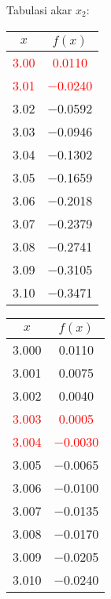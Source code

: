 \documentclass{article}
\begin{document}
\begin{enumerate}
\begin{enumerate}
            Tabulasi akar $x_2$: \\
            \begin{tabular}{|c|c|}
                \hline
                $x$   & $f(x)$ \\
                \hline
                \textcolor{red}{\num{3,00}} & \textcolor{red}{\num{0,0110}} \\
                \textcolor{red}{\num{3,01}} & \textcolor{red}{\num{-0,0240}} \\
                \num{3,02} & \num{-0,0592} \\
                \num{3,03} & \num{-0,0946} \\
                \num{3,04} & \num{-0,1302} \\
                \num{3,05} & \num{-0,1659} \\
                \num{3,06} & \num{-0,2018} \\
                \num{3,07} & \num{-0,2379} \\
                \num{3,08} & \num{-0,2741} \\
                \num{3,09} & \num{-0,3105} \\
                \num{3,10} & \num{-0,3471} \\
                \hline
                \end{tabular}\quad
                \begin{tabular}{|c|c|}
                \hline
                $x$   & $f(x)$ \\
                \hline
                \num{3,000} & \num{0,0110} \\
                \num{3,001} & \num{0,0075} \\
                \num{3,002} & \num{0,0040} \\
                \textcolor{red}{\num{3,003}} & \textcolor{red}{\num{0,0005}} \\
                \textcolor{red}{\num{3,004}} & \textcolor{red}{\num{-0,0030}} \\
                \num{3,005} & \num{-0,0065} \\
                \num{3,006} & \num{-0,0100} \\
                \num{3,007} & \num{-0,0135} \\
                \num{3,008} & \num{-0,0170} \\
                \num{3,009} & \num{-0,0205} \\
                \num{3,010} & \num{-0,0240} \\

\end{tabular}
\end{enumerate}
\end{enumerate}
\end{document}
